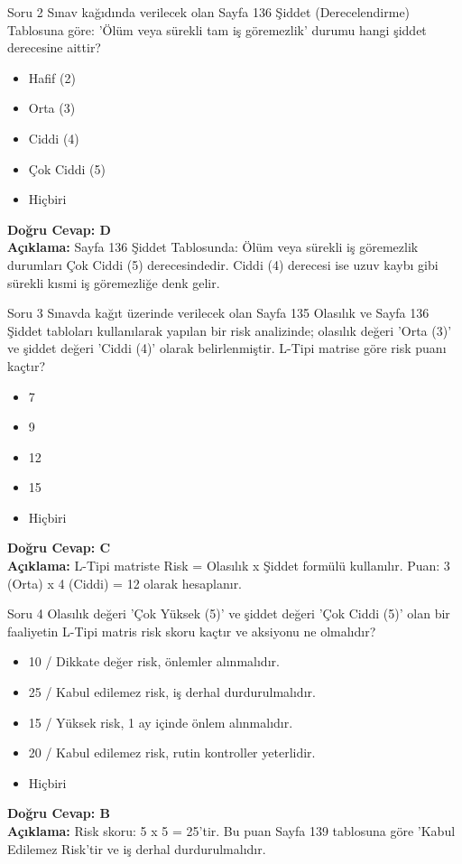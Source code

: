 \documentclass[12pt,a4paper]{article}
\begin{document}
\begin{testcard}{Soru 2}
    Sınav kağıdında verilecek olan Sayfa 136 Şiddet (Derecelendirme) Tablosuna göre: 'Ölüm veya sürekli tam iş göremezlik' durumu hangi şiddet derecesine aittir?
    \begin{itemize}
        \item[A)] Hafif (2)
        \item[B)] Orta (3)
        \item[C)] Ciddi (4)
        \item[D)] Çok Ciddi (5)
        \item[E)] Hiçbiri
    \end{itemize}
    \tcblower
    \textbf{Doğru Cevap: D} \\
    \textbf{Açıklama:} Sayfa 136 Şiddet Tablosunda: Ölüm veya sürekli iş göremezlik durumları Çok Ciddi (5) derecesindedir. Ciddi (4) derecesi ise uzuv kaybı gibi sürekli kısmi iş göremezliğe denk gelir.
\end{testcard}

\begin{testcard}{Soru 3}
    Sınavda kağıt üzerinde verilecek olan Sayfa 135 Olasılık ve Sayfa 136 Şiddet tabloları kullanılarak yapılan bir risk analizinde; olasılık değeri 'Orta (3)' ve şiddet değeri 'Ciddi (4)' olarak belirlenmiştir. L-Tipi matrise göre risk puanı kaçtır?
    \begin{itemize}
        \item[A)] 7
        \item[B)] 9
        \item[C)] 12
        \item[D)] 15
        \item[E)] Hiçbiri
    \end{itemize}
    \tcblower
    \textbf{Doğru Cevap: C} \\
    \textbf{Açıklama:} L-Tipi matriste Risk = Olasılık x Şiddet formülü kullanılır. Puan: 3 (Orta) x 4 (Ciddi) = 12 olarak hesaplanır.
\end{testcard}

\begin{testcard}{Soru 4}
    Olasılık değeri 'Çok Yüksek (5)' ve şiddet değeri 'Çok Ciddi (5)' olan bir faaliyetin L-Tipi matris risk skoru kaçtır ve aksiyonu ne olmalıdır?
    \begin{itemize}
        \item[A)] 10 / Dikkate değer risk, önlemler alınmalıdır.
        \item[B)] 25 / Kabul edilemez risk, iş derhal durdurulmalıdır.
        \item[C)] 15 / Yüksek risk, 1 ay içinde önlem alınmalıdır.
        \item[D)] 20 / Kabul edilemez risk, rutin kontroller yeterlidir.
        \item[E)] Hiçbiri
    \end{itemize}
    \tcblower
    \textbf{Doğru Cevap: B} \\
    \textbf{Açıklama:} Risk skoru: 5 x 5 = 25'tir. Bu puan Sayfa 139 tablosuna göre 'Kabul Edilemez Risk'tir ve iş derhal durdurulmalıdır.
\end{testcard}
\end{document}
